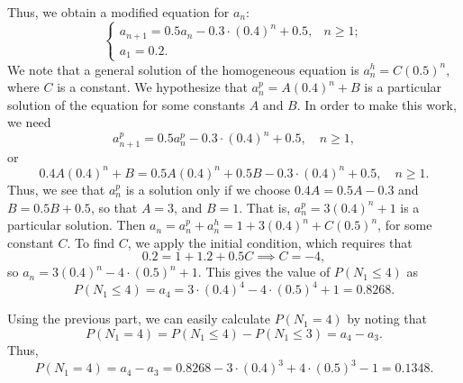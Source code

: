 \documentclass{homework}
\begin{document}
\begin{alphaparts}
		Thus, we obtain a modified equation for $a_n$:
		\begin{equation*}
		\begin{cases}
			a_{n+1} = 0.5a_n - 0.3\cdot(0.4)^n + 0.5, & n \ge 1;\\
			a_1 = 0.2.		
		\end{cases}
		\end{equation*}
		We note that a general solution of the homogeneous equation is $a^h_n = C(0.5)^n$, where $C$ is a constant. We hypothesize that $a^p_n = A(0.4)^n + B$ is a particular solution of the equation for some constants $A$ and $B$. In order to make this work, we need
		\begin{equation*}
			a^p_{n+1} = 0.5a^p_n - 0.3\cdot(0.4)^n + 0.5, \quad n \ge 1,
		\end{equation*}
		or 
		\begin{equation*}
			0.4A (0.4)^n + B = 0.5A(0.4)^n + 0.5B -0.3\cdot(0.4)^n + 0.5, \quad n \ge 1.
		\end{equation*}
		Thus, we see that $a^p_n$ is a solution only if we choose $0.4A = 0.5A -0.3$ and $B = 0.5B + 0.5$, so that $A = 3$, and $B = 1$. That is, $a^p_n = 3(0.4)^n + 1$ is a particular solution. Then $a_n = a^p_n + a^h_n = 1 + 3(0.4)^n + C(0.5)^n$, for some constant $C$. To find $C$, we apply the initial condition, which requires that
		\begin{equation*}
			0.2 = 1 + 1.2 + 0.5C \implies C = -4,
		\end{equation*}
		so $a_n = 3(0.4)^n - 4\cdot(0.5)^n + 1$. This gives the value of $P(N_1 \le 4)$ as
		\begin{equation*}
			P(N_1 \le 4) = a_4 = 3\cdot(0.4)^4 - 4\cdot(0.5)^4 +1 = 0.8268.
		\end{equation*}
		
		\questionpart Using the previous part, we can easily calculate $P(N_1=4)$ by noting that 
		\begin{equation*}
			P(N_1=4) = P(N_1\le 4) - P(N_1 \le 3) = a_4 - a_3.
		\end{equation*}
		Thus,
		\begin{equation*}
			P(N_1 = 4) = a_4 - a_3 = 0.8268 - 3\cdot(0.4)^3 + 4\cdot(0.5)^3 - 1 = 0.1348.
		\end{equation*}
	\end{alphaparts}
	
\end{document}
